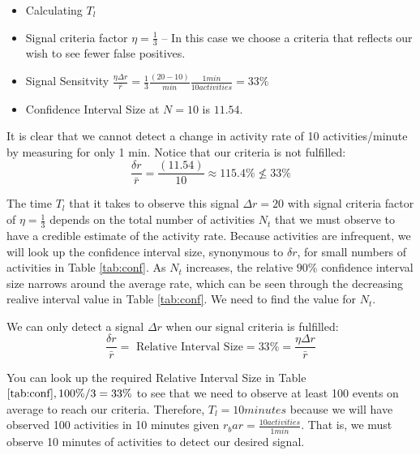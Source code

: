 \documentclass{article}
\begin{document}
\begin{itemize}
\item Calculating $T_{l}$
\item Signal criteria factor $\eta=\frac{1}{3}$ -- In this case we choose a criteria that reflects our wish to see fewer false positives.
\item Signal Sensitvity $\frac{\eta \Delta r}{\bar{r}} = \frac{1}{3}\frac{(20-10)}{min} \frac{1 min}{10 activities}= 33\%$
\item Confidence Interval Size at $N =10$ is $11.54$. %
\end{itemize}

It is clear that we cannot detect a change in activity rate of 10 activities/minute by measuring for only 1 min.  Notice that our criteria is not fulfilled:
\begin{equation}
    \label{eq:ex2:notmet}
    \frac{\delta r}{\bar{r}} = \frac{(11.54)}{10} \approx 115.4\% \not\le 33\% 
\end{equation}

The time $T_{l}$ that it takes to observe this signal $\Delta r =20$ with signal criteria factor of $\eta=\frac{1}{3}$ depends 
on the total number of activities $N_t$ that we must observe to have a credible estimate of the activity rate. Because activities 
are infrequent, we will look up the confidence interval size, synonymous to $\delta r$, for small numbers of activities 
in Table \ref{tab:conf}.  As $N_t$ increases, the relative $90\%$ confidence interval size narrows around the 
average rate, which can be seen through the decreasing realive interval value in Table \ref{tab:conf}.  We need to 
find the value for $N_t$.

We can only detect a signal $\Delta r$ when our signal criteria is fulfilled:
\begin{equation}
    \label{eq:ex2:met}
    \frac{\delta r}{\bar{r}} = \text{ Relative Interval Size} = 33\% =  \frac{\eta \Delta r}{\bar{r}}
\end{equation}

You can look up the required Relative Interval Size in Table $\ref{tab:conf}, 100\%/3 = 33\%$ to see
that we need to observe at least 100 events on average to reach our criteria. Therefore, $T_l = 10 minutes$ because
we will have observed 100 activities in 10 minutes given $r_bar = \frac{10 activities}{1 min}$. That is, we 
must observe 10 minutes of activities to detect our desired signal.
\end{document}
